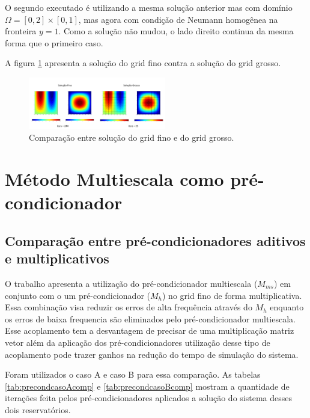 O segundo executado é utilizando a mesma solução anterior mas com domínio $\Omega = [0, 2] \times [0, 1]$, mas agora com condição de Neumann homogênea na fronteira $y=1$. Como a solução não mudou, o lado direito continua da mesma forma que o primeiro caso.

A figura \ref{fig:NeumannHomogeneo} apresenta a solução do grid fino contra a solução do grid grosso.

\begin{figure}[!htbp]
\label{fig:NeumannHomogeneo}
\centering
\includegraphics[width=6cm]{chap08/figs/NeumannHomogeneoTemp.png}
\caption{Comparação entre solução do grid fino e do grid grosso. }
\end{figure}



\section{Método Multiescala como pré-condicionador}

\subsection{Comparação entre pré-condicionadores aditivos e multiplicativos}

O trabalho \cite{casteletto} apresenta a utilização do pré-condicionador multiescala ($M_{ms}$) em conjunto com o um pré-condicionador ($M_h$) no grid fino  de forma multiplicativa. Essa combinação visa reduzir os erros de alta frequência através do $M_h$ enquanto os erros de baixa frequencia são eliminados pelo pré-condicionador multiescala. Esse acoplamento tem a desvantagem de precisar de uma multiplicação matriz vetor além da aplicação dos pré-condicionadores utilização desse tipo de acoplamento pode trazer ganhos na redução do tempo de simulação do sistema. 

Foram utilizados o caso A e caso B para essa comparação. As tabelas \ref{tab:precondcasoAcomp} e \ref{tab:precondcasoBcomp} mostram a quantidade de iterações feita pelos pré-condicionadores aplicados a solução do sistema desses dois reservatórios. 



